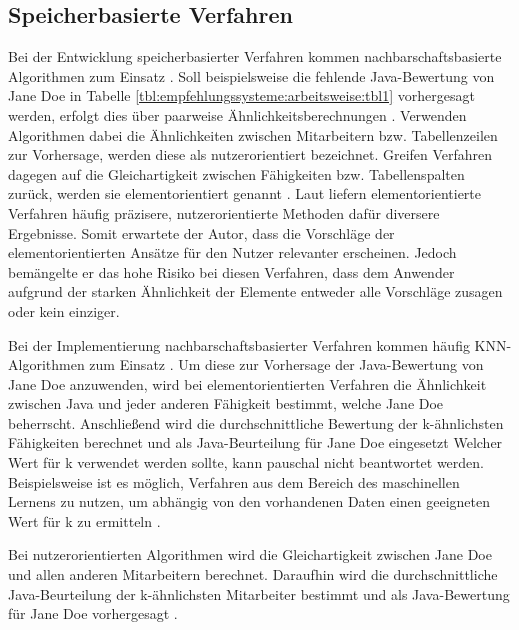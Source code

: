 \subsection{Speicherbasierte Verfahren}
\label{ch:empfehlungssysteme:cf:speicherbasiert}
Bei der Entwicklung speicherbasierter Verfahren kommen nachbarschaftsbasierte Algorithmen zum Einsatz \cite[S. 29]{recommenderSystems:2016}. Soll beispielsweise die fehlende Java-Bewertung von Jane Doe in Tabelle \ref{tbl:empfehlungssysteme:arbeitsweise:tbl1} vorhergesagt werden, erfolgt dies über paarweise Ähnlichkeitsberechnungen \cite[S. 2f.]{bharti:2019}. Verwenden Algorithmen dabei die Ähnlichkeiten zwischen Mitarbeitern bzw. Tabellenzeilen zur Vorhersage, werden diese als nutzerorientiert bezeichnet. Greifen Verfahren dagegen auf die Gleichartigkeit zwischen Fähigkeiten bzw. Tabellenspalten zurück, werden sie elementorientiert genannt \cite[S. 1f.]{duong:2018}. Laut \textcite[S. 42]{recommenderSystems:2016} liefern elementorientierte Verfahren häufig präzisere, nutzerorientierte Methoden dafür diversere Ergebnisse. Somit erwartete der Autor, dass die Vorschläge der elementorientierten Ansätze für den Nutzer relevanter erscheinen. Jedoch bemängelte er das hohe Risiko bei diesen Verfahren, dass dem Anwender aufgrund der starken Ähnlichkeit der Elemente entweder alle Vorschläge zusagen oder kein einziger.

Bei der Implementierung nachbarschaftsbasierter Verfahren kommen häufig \ac{KNN}-Algorithmen zum Einsatz \cite[S. 1]{nayak:2018}. Um diese zur Vorhersage der Java-Bewertung von Jane Doe anzuwenden, wird bei elementorientierten Verfahren die Ähnlichkeit zwischen Java und jeder anderen Fähigkeit bestimmt, welche Jane Doe beherrscht. Anschließend wird die durchschnittliche Bewertung der k-ähnlichsten Fähigkeiten berechnet und als Java-Beurteilung für Jane Doe eingesetzt \cite[S. 2]{hao:2013} Welcher Wert für k verwendet werden sollte, kann pauschal nicht beantwortet werden. Beispielsweise ist es möglich, Verfahren aus dem Bereich des maschinellen Lernens zu nutzen, um abhängig von den vorhandenen Daten einen geeigneten Wert für k zu ermitteln \cite[S. 2f.]{jiang:2007}.

Bei nutzerorientierten Algorithmen wird die Gleichartigkeit zwischen Jane Doe und allen anderen Mitarbeitern berechnet. Daraufhin wird die durchschnittliche Java-Beurteilung der k-ähnlichsten Mitarbeiter bestimmt und als Java-Bewertung für Jane Doe vorhergesagt \cite[S. 2f.]{hao:2013}.

